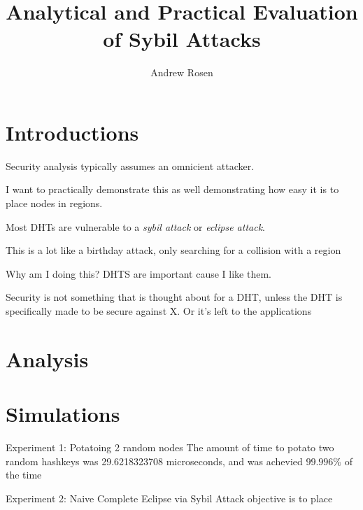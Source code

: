 \documentclass[10pt,a4paper]{article}
\author{Andrew Rosen}
\title{Analytical and Practical Evaluation of Sybil Attacks}
\begin{document}
\maketitle


\section{Introductions}
Security analysis typically assumes an omnicient attacker. 

I want to practically demonstrate this as well demonstrating how easy it is to place nodes in regions.

Most DHTs are vulnerable to a \textit{sybil attack} or \textit{eclipse attack}.


This is a lot like a birthday attack, only searching for a collision with a region


Why am I doing this?
DHTS are important cause I like them.

Security is not something that is thought about for a DHT, unless the 
DHT is specifically made to be secure against X.  
Or it's left to the applications

\section{Analysis}


\section{Simulations}

Experiment 1: Potatoing 2 random nodes
The amount of time to potato two random hashkeys was 29.6218323708 microseconds, and was achevied $ 99.996\%$ of the time



Experiment 2:  Naive Complete Eclipse via Sybil
Attack objective is to place
\end{document}
